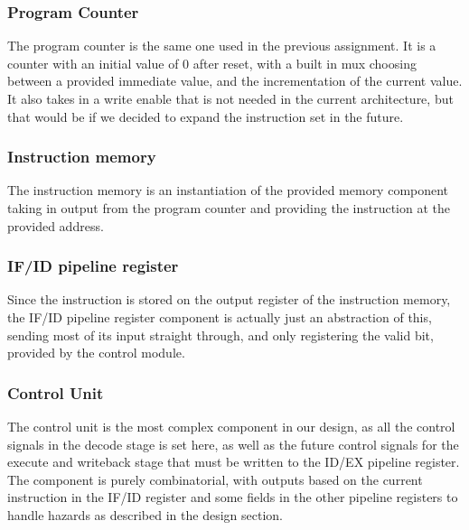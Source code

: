 \documentclass[11pt]{report}
\begin{document}
\subsubsection*{Program Counter}
The program counter is the same one used in the previous assignment. 
It is a counter with an initial value of 0 after reset, with a built in
mux choosing between a provided immediate value, and the incrementation of
the current value. It also takes in a write enable that is not needed in
the current architecture, but that would be if we decided to expand the 
instruction set in the future.

\subsubsection*{Instruction memory}
The instruction memory is an instantiation of the provided memory component taking in
output from the program counter and providing the instruction at the provided
address.
\subsubsection*{IF/ID pipeline register}
Since the instruction is stored on the output register of the instruction memory,
the IF/ID pipeline register component is actually just an abstraction of this, sending 
most of its input straight through, and only registering the valid bit, provided by
the control module.

\subsubsection*{Control Unit}

The control unit is the most complex component in our design, as all the control
signals in the decode stage is set here, as well as the future control signals for
the execute and writeback stage that must be written to the ID/EX pipeline register.
The component is purely combinatorial, with outputs based on the current instruction in the
IF/ID register and some fields in the other pipeline registers to handle hazards as
described in the design section. %
\end{document}
